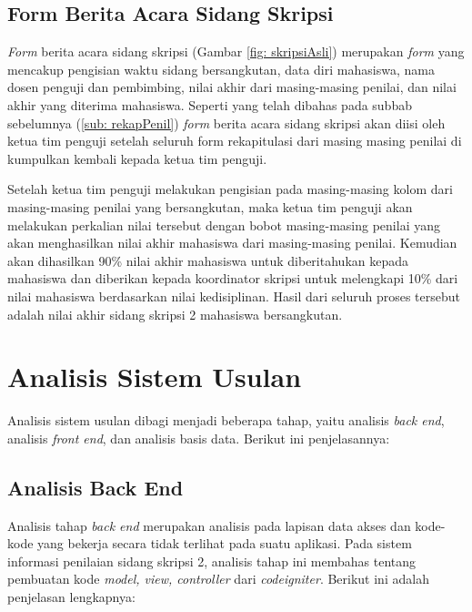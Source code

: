 	\subsection{Form Berita Acara Sidang Skripsi}
	\label{sub: formSkripsi}
	
	\textit{Form} berita acara sidang skripsi (Gambar \ref{fig: skripsiAsli}) merupakan \textit{form} yang mencakup pengisian waktu sidang bersangkutan, data diri mahasiswa, nama dosen penguji dan pembimbing, nilai akhir dari masing-masing penilai, dan nilai akhir yang diterima mahasiswa. Seperti yang telah dibahas pada subbab sebelumnya (\ref{sub: rekapPenil}) \textit{form} berita acara sidang skripsi akan diisi oleh ketua tim penguji setelah seluruh form rekapitulasi dari masing masing penilai di kumpulkan kembali kepada ketua tim penguji.
	
	Setelah ketua tim penguji melakukan pengisian pada masing-masing kolom dari masing-masing penilai yang bersangkutan, maka ketua tim penguji akan melakukan perkalian nilai tersebut dengan bobot masing-masing penilai yang akan menghasilkan nilai akhir mahasiswa dari masing-masing penilai. Kemudian akan dihasilkan 90\% nilai akhir mahasiswa untuk diberitahukan kepada mahasiswa dan diberikan kepada koordinator skripsi untuk melengkapi 10\% dari nilai mahasiswa berdasarkan nilai kedisiplinan. Hasil dari seluruh proses tersebut adalah nilai akhir sidang skripsi 2 mahasiswa bersangkutan.
	
\section{Analisis Sistem Usulan}
\label{sec: analisisSUsulan}

Analisis sistem usulan dibagi menjadi beberapa tahap, yaitu analisis \textit{back end}, analisis \textit{front end}, dan analisis basis data. Berikut ini penjelasannya:
	
	\subsection{Analisis Back End}
	\label{sub: backEnd}
	
	Analisis tahap \textit{back end} merupakan analisis pada lapisan data akses dan kode-kode yang bekerja secara tidak terlihat pada suatu aplikasi. Pada sistem informasi penilaian sidang skripsi 2, analisis tahap ini membahas tentang pembuatan kode \textit{model, view, controller} dari \textit{codeigniter}. Berikut ini adalah penjelasan lengkapnya:
	
